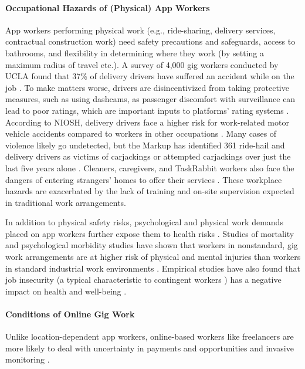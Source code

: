 \paragraph{Occupational Hazards of (Physical) App Workers}
App workers performing physical work (e.g., ride-sharing, delivery services, contractual construction work) need safety precautions and safeguards, access to bathrooms, and flexibility in determining where they work (by setting a maximum radius of travel etc.). A survey of 4,000 gig workers conducted by UCLA found that 37\% of delivery drivers have suffered an accident while on the job \cite{noauthor_undated-is}. To make matters worse, drivers are disincentivized from taking protective measures, such as using dashcams, as passenger discomfort with surveillance can lead to poor ratings, which are important inputs to platforms' rating systems \cite{jbho}. According to NIOSH, delivery drivers face a higher risk for work-related motor vehicle accidents compared to workers in other occupations \cite{noauthor_1998-ts}. Many cases of violence likely go undetected, but the Markup has identified 361 ride-hail and delivery drivers as victims of carjackings or attempted carjackings over just the last five years alone \cite{Kerr_undated-zw}. Cleaners, caregivers, and TaskRabbit workers also face the dangers of entering strangers' homes to offer their services \cite{rc6G}. These workplace hazards are exacerbated by the lack of training and on-site supervision expected in traditional work arrangements.

In addition to physical safety risks, psychological and physical work demands placed on app workers further expose them to health risks \cite{Keith2020-zb}. Studies of mortality and psychological morbidity studies have shown that workers in nonstandard, gig work arrangements are at higher risk of physical and mental injuries than workers in standard industrial work environments \cite{Howard2017-wd}. Empirical studies have also found that job insecurity (a typical characteristic to contingent workers ) has a negative impact on health and well-being \cite{De_witte2016-wz}.

\paragraph{Conditions of Online Gig Work}
Unlike location-dependent app workers, online-based workers like freelancers are more likely to deal with uncertainty in payments and opportunities \cite{freelancecontrol,making} and invasive monitoring \cite{Popiel2017-wu}. 

